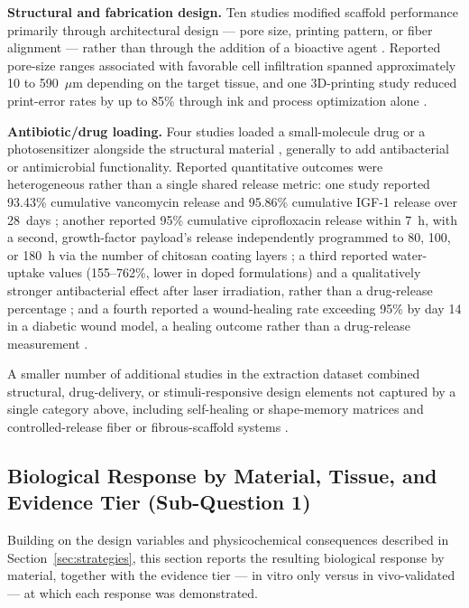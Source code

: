 \documentclass[5p,times,twocolumn]{elsarticle}
\begin{document}
\textbf{Structural and fabrication design.} Ten studies modified scaffold performance primarily through architectural design --- pore size, printing pattern, or fiber alignment --- rather than through the addition of a bioactive agent \cite{ref1,ref11,ref17,ref32,ref39,ref40,ref45,ref62,ref63,ref71}. Reported pore-size ranges associated with favorable cell infiltration spanned approximately 10 to 590~$\mu$m depending on the target tissue, and one 3D-printing study reduced print-error rates by up to 85\% through ink and process optimization alone \cite{ref39}.

\textbf{Antibiotic/drug loading.} Four studies loaded a small-molecule drug or a photosensitizer alongside the structural material \cite{ref25,ref31,ref33,ref72}, generally to add antibacterial or antimicrobial functionality. Reported quantitative outcomes were heterogeneous rather than a single shared release metric: one study reported 93.43\% cumulative vancomycin release and 95.86\% cumulative IGF-1 release over 28~days \cite{ref25}; another reported 95\% cumulative ciprofloxacin release within 7~h, with a second, growth-factor payload's release independently programmed to 80, 100, or 180~h via the number of chitosan coating layers \cite{ref72}; a third reported water-uptake values (155--762\%, lower in doped formulations) and a qualitatively stronger antibacterial effect after laser irradiation, rather than a drug-release percentage \cite{ref31}; and a fourth reported a wound-healing rate exceeding 95\% by day 14 in a diabetic wound model, a healing outcome rather than a drug-release measurement \cite{ref33}.

A smaller number of additional studies in the extraction dataset combined structural, drug-delivery, or stimuli-responsive design elements not captured by a single category above, including self-healing or shape-memory matrices and controlled-release fiber or fibrous-scaffold systems \cite{ref3,ref35,ref78}.

\subsection{Biological Response by Material, Tissue, and Evidence Tier (Sub-Question 1)}
\label{sec:biocompat}

Building on the design variables and physicochemical consequences described in Section~\ref{sec:strategies}, this section reports the resulting biological response by material, together with the evidence tier --- in vitro only versus in vivo-validated --- at which each response was demonstrated.
\end{document}
